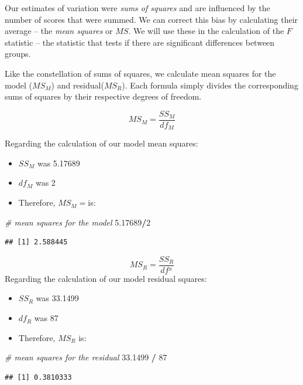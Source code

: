 \documentclass[
  english,
]{book}
\newenvironment{Shaded}{\begin{snugshade}}{\end{snugshade}}
\newcommand{\CommentTok}[1]{\textcolor[rgb]{0.56,0.35,0.01}{\textit{#1}}}
\newcommand{\DecValTok}[1]{\textcolor[rgb]{0.00,0.00,0.81}{#1}}
\newcommand{\FloatTok}[1]{\textcolor[rgb]{0.00,0.00,0.81}{#1}}
\newcommand{\OperatorTok}[1]{\textcolor[rgb]{0.81,0.36,0.00}{\textbf{#1}}}
\newcommand{\StringTok}[1]{\textcolor[rgb]{0.31,0.60,0.02}{#1}}
\providecommand{\tightlist}{%
  \setlength{\itemsep}{0pt}\setlength{\parskip}{0pt}}
\begin{document}
Our estimates of variation were \emph{sums of squares} and are influenced by the number of scores that were summed. We can correct this bias by calculating their average -- the \emph{mean squares} or \(MS\). We will use these in the calculation of the \(F\) statistic -- the statistic that tests if there are significant differences between groups.

Like the constellation of sums of squares, we calculate mean squares for the model (\(MS_M\)) and residual(\(MS_R\)). Each formula simply divides the corresponding sums of squares by their respective degrees of freedom.

\[MS_M = \frac{SS_{M}}{df{_{M}}}\]

Regarding the calculation of our model mean squares:

\begin{itemize}
\tightlist
\item
  \(SS_M\) was 5.17689
\item
  \(df_M\) was 2
\item
  Therefore, \(MS_M=\)is:
\end{itemize}

\begin{Shaded}
\begin{Highlighting}[]
\CommentTok{# mean squares for the model}
\FloatTok{5.17689}\OperatorTok{/}\DecValTok{2}
\end{Highlighting}
\end{Shaded}

\begin{verbatim}
## [1] 2.588445
\end{verbatim}

\[MS_R = \frac{SS_{R}}{df^{_{R}}}\]
Regarding the calculation of our model residual squares:

\begin{itemize}
\tightlist
\item
  \(SS_R\) was 33.1499
\item
  \(df_R\) was 87
\item
  Therefore, \(MS_R\) is:
\end{itemize}

\begin{Shaded}
\begin{Highlighting}[]
\CommentTok{# mean squares for the residual}
\FloatTok{33.1499} \OperatorTok{/}\StringTok{ }\DecValTok{87}
\end{Highlighting}
\end{Shaded}

\begin{verbatim}
## [1] 0.3810333
\end{verbatim}
\end{document}
